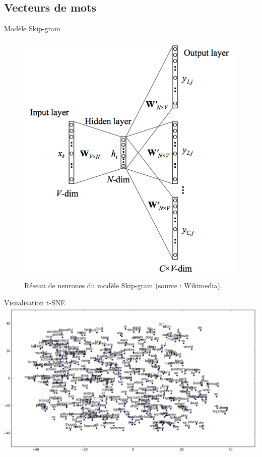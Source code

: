 \documentclass{beamer}
\begin{document}
\subsection{Vecteurs de mots}

\begin{frame}{Modèle Skip-gram}
\begin{figure}
\begin{center}
\includegraphics[scale=0.5]{images/skip_gram.png}
\caption{Réseau de neurones du modèle Skip-gram (source : Wikimedia).}
\label{skip_gram}
\end{center}
\end{figure}
\end{frame}

\begin{frame}{Visualisation t-SNE}
\includegraphics[scale=0.35]{images/tsne_plot.png}
\end{frame}
\end{document}
